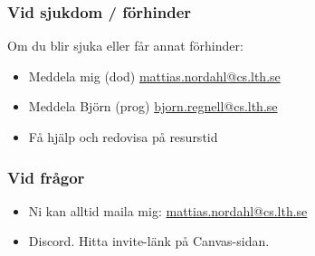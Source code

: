 \begin{frame}[fragile=singleslide]
	\frametitle{Vid sjukdom / förhinder}

	Om du blir sjuka eller får annat förhinder:
	\begin{itemize}
		\item Meddela mig (dod) \url{mattias.nordahl@cs.lth.se}
		\item Meddela Björn (prog) \url{bjorn.regnell@cs.lth.se}
		\item Få hjälp och redovisa på resurstid
	\end{itemize}
\end{frame}

\begin{frame}[fragile=singleslide]
	\frametitle{Vid frågor}

	\begin{itemize}
		\item Ni kan alltid maila mig: \url{mattias.nordahl@cs.lth.se}
		\item Discord. Hitta invite-länk på Canvas-sidan.
	\end{itemize}
\end{frame}
